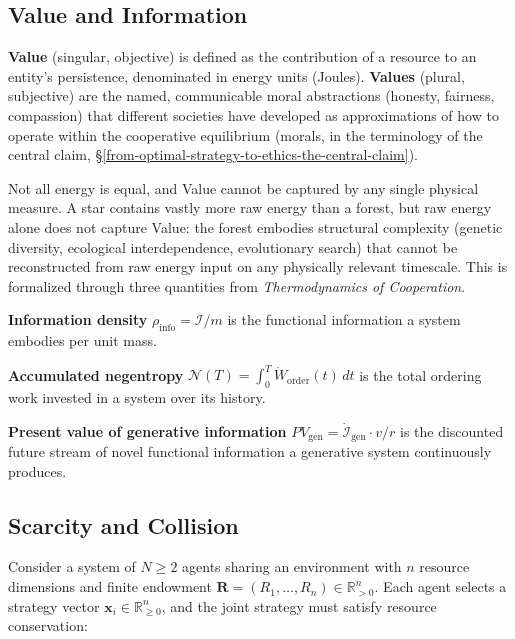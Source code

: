 \documentclass[11pt]{article}
\theoremstyle{plain}
\theoremstyle{definition}
\theoremstyle{remark}
\let\origsubsection\subsection
\renewcommand{\subsection}{\needspace{7\baselineskip}\origsubsection}
\begin{document}
\subsection{Value and Information}\label{value-and-information}

\textbf{Value} (singular, objective) is defined as the contribution of a
resource to an entity's persistence, denominated in energy units
(Joules). \textbf{Values} (plural, subjective) are the named,
communicable moral abstractions (honesty, fairness, compassion) that
different societies have developed as approximations of how to operate
within the cooperative equilibrium (morals, in the terminology of the
central claim,
§\ref{from-optimal-strategy-to-ethics-the-central-claim}).

Not all energy is equal, and Value cannot be captured by any single
physical measure. A star contains vastly more raw energy than a forest,
but raw energy alone does not capture Value: the forest embodies
structural complexity (genetic diversity, ecological interdependence,
evolutionary search) that cannot be reconstructed from raw energy input
on any physically relevant timescale. This is formalized through three
quantities from \emph{Thermodynamics of Cooperation}.

\textbf{Information density} \(\rho_{\text{info}} = \mathcal{I} / m\)
\citep{TC-III} is the functional information a system embodies per unit
mass.

\textbf{Accumulated negentropy}
\(\mathcal{N}(T) = \int_0^T \dot{W}_{\text{order}}(t)\,dt\)
\citep{TC-III} is the total ordering work invested in a system over its
history.

\textbf{Present value of generative information}
\(PV_{\text{gen}} = \dot{\mathcal{I}}_{\text{gen}} \cdot v / r\)
\citep{TC-III} is the discounted future stream of novel functional
information a generative system continuously produces.

\subsection{Scarcity and Collision}\label{scarcity-and-collision}

Consider a system of \(N \geq 2\) agents sharing an environment with
\(n\) resource dimensions and finite endowment
\(\mathbf{R} = (R_1, \ldots, R_n) \in \mathbb{R}_{>0}^n\). Each agent
selects a strategy vector \(\mathbf{x}_i \in \mathbb{R}_{\geq 0}^n\),
and the joint strategy must satisfy resource conservation:
\end{document}

